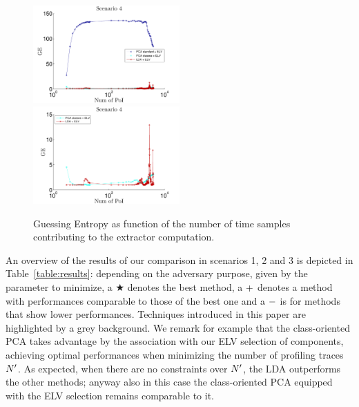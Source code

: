 \begin{figure}
\includegraphics[width=0.5\textwidth]{figures/Criterion4.pdf}
\includegraphics[width=0.5\textwidth]{figures/Criterion4cutted.pdf} 
\caption{Guessing Entropy as function of the number of time samples contributing to the extractor computation.}\label{fig:4}
\end{figure}



\medskip

An overview of the results of our comparison in scenarios 1, 2 and 3 is depicted in Table~\ref{table:results}: depending on the adversary purpose, given by the parameter to minimize, a $\bigstar$ denotes the best method, a ${\bf +}$ denotes a method with performances comparable to those of the best one and a ${\bf -}$ is for methods that show lower performances. Techniques introduced in this paper are highlighted by a grey background. We remark for example that the class-oriented PCA takes advantage by the association with our ELV selection of components, achieving optimal performances when minimizing the number of profiling traces $\numTraces[]'$. As expected, when there are no constraints over $\numTraces[]'$, the LDA outperforms the other methods; anyway also in this case the class-oriented PCA equipped with the ELV selection remains comparable to it.


